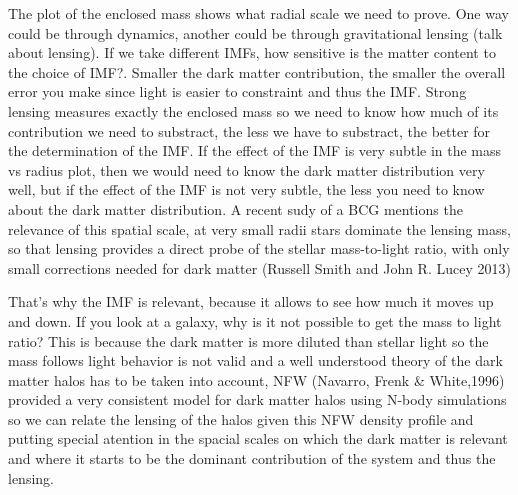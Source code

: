The plot of the enclosed mass shows what radial scale we need to prove. One way could be through dynamics, another could be through gravitational lensing (talk about lensing). If we take different IMFs, how sensitive is the matter content to the choice of IMF?. Smaller the dark matter contribution, the smaller the overall error you make since light is easier to constraint and thus the IMF. Strong lensing measures exactly the enclosed mass so we need to know how much of its contribution we need to substract, the less we have to substract, the better for the determination of the IMF. If the effect of the IMF is very subtle in the mass vs radius plot, then we would need to know the dark matter distribution very well, but if the effect of the IMF is not very subtle, the less you need to know about the dark matter distribution. A recent sudy of a BCG mentions the relevance of this spatial scale, at very small radii stars dominate the lensing mass, so that lensing provides a direct probe of the stellar mass-to-light ratio, with only small corrections needed for dark matter (Russell Smith and John R. Lucey 2013) 

That's why the IMF is relevant, because it allows to see how much it moves up and down. If you look at a galaxy, why is it not possible to get the mass to light ratio? This is because the dark matter is more diluted than stellar light so the mass follows light behavior is not valid and a well understood theory of the dark matter halos has to be taken into account, NFW (Navarro, Frenk \& White,1996) provided a very consistent model for dark matter halos using N-body simulations so we can relate the lensing of the halos given this NFW density profile and putting special atention in the spacial scales on which the dark matter is relevant and where it starts to be the dominant contribution of the system and thus the lensing. 
  
\newpage
